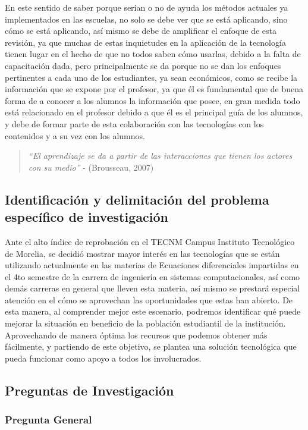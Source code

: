 \documentclass{article}
\begin{document}
En este sentido de saber porque serían o no de ayuda los métodos actuales ya implementados en las escuelas, no solo se debe ver que se está aplicando, sino cómo se está aplicando, así mismo se debe de amplificar el enfoque de esta revisión, ya que muchas de estas inquietudes en la aplicación de la tecnología tienen lugar en el hecho de que no todos saben cómo usarlas, debido a la falta de capacitación dada, pero principalmente se da porque no se dan los enfoques pertinentes a cada uno de los estudiantes, ya sean económicos, como se recibe la información que se expone por el profesor, ya que él es fundamental que de buena forma de a conocer a los alumnos la información que posee, en gran medida todo está relacionado en el profesor debido a que él es el principal guía de los alumnos, y debe de formar parte de esta colaboración con las tecnologías con los contenidos y a su vez con los alumnos.

\begin{quote}
  \textit{“El aprendizaje se da a partir de las interacciones que tienen los actores con su medio”} \cite{Brousseau} - (Brousseau, 2007)
\end{quote}

\subsection{Identificación y delimitación del problema específico de investigación}

Ante el alto índice de reprobación en el TECNM Campus Instituto Tecnológico de Morelia, se decidió mostrar mayor interés en las tecnologías que se están utilizando actualmente en las materias de Ecuaciones diferenciales impartidas en el 4to semestre de la carrera de ingeniería en sistemas computacionales, así como demás carreras en general que lleven esta materia, así mismo se prestará especial atención en el cómo se aprovechan las oportunidades que estas han abierto. De esta manera, al comprender mejor este escenario, podremos identificar qué puede mejorar la situación en beneficio de la población estudiantil de la institución.
Aprovechando de manera óptima los recursos que podemos obtener más fácilmente, y partiendo de este objetivo, se plantea una solución tecnológica que pueda funcionar como apoyo a todos los involucrados. 

\subsection{Preguntas de Investigación}
\subsubsection{Pregunta General}
\end{document}
